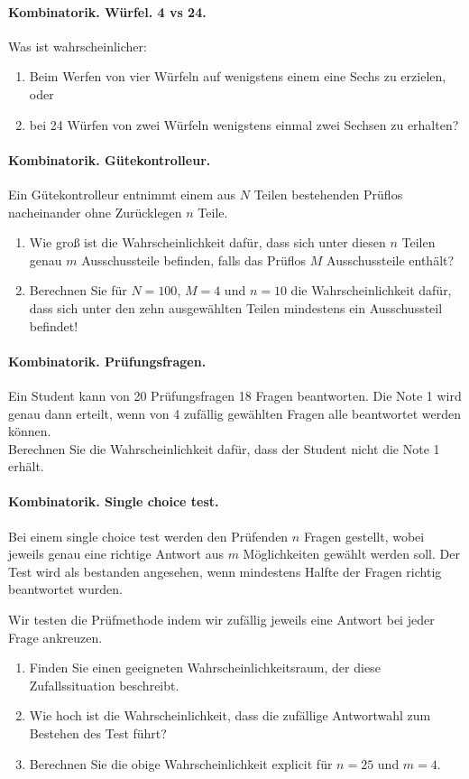 \paragraph{Kombinatorik. Würfel. 4 vs 24.}
Was ist wahrscheinlicher:
\begin{enumerate}
    \item Beim Werfen von vier Würfeln auf wenigstens einem eine Sechs zu
        erzielen, oder
    \item bei 24 Würfen von zwei Würfeln wenigstens einmal zwei Sechsen zu
        erhalten?
\end{enumerate}


\paragraph{Kombinatorik. Gütekontrolleur.}
Ein Gütekontrolleur entnimmt einem aus $N$ Teilen bestehenden Prüflos
nacheinander ohne Zurücklegen $n$ Teile.
\begin{enumerate}
\item Wie groß ist die Wahrscheinlichkeit dafür, dass sich unter diesen $n$
Teilen genau $m$ Ausschussteile befinden, falls das Prüflos $M$ Ausschussteile
enthält?
\item Berechnen Sie für $N=100$, $M=4$ und $n=10$ die Wahrscheinlichkeit
dafür, dass sich unter den zehn ausgewählten Teilen mindestens ein
Ausschussteil
befindet!
\end{enumerate}


\paragraph{Kombinatorik. Prüfungsfragen.}
Ein Student kann von 20 Prüfungsfragen 18 Fragen beantworten. Die Note 1 wird
genau dann erteilt, wenn von 4 zufällig gewählten Fragen alle beantwortet
werden können. \\
Berechnen Sie die Wahrscheinlichkeit dafür, dass der Student nicht die Note 1
erhält.


\paragraph{Kombinatorik. Single choice test.} Bei einem single choice test werden
den Prüfenden $n$ Fragen gestellt, wobei jeweils genau eine richtige Antwort aus
$m$ Möglichkeiten gewählt werden soll. Der Test wird als bestanden angesehen, wenn mindestens 
Halfte der Fragen richtig beantwortet wurden.

Wir testen die Prüfmethode indem wir zufällig jeweils eine Antwort bei jeder Frage
ankreuzen. 
\begin{enumerate}
    \item Finden Sie einen geeigneten Wahrscheinlichkeitsraum, der diese
        Zufallssituation beschreibt.
    \item Wie hoch ist die Wahrscheinlichkeit, dass die zufällige Antwortwahl zum 
        Bestehen des Test führt?
    \item Berechnen Sie die obige Wahrscheinlichkeit explicit für $n=25$ und $m=4$.
\end{enumerate}





